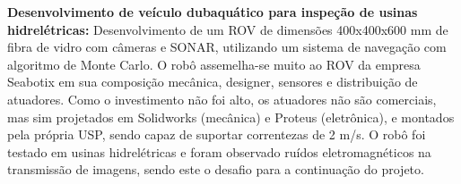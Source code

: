\textbf{Desenvolvimento de veículo dubaquático para inspeção de usinas
hidrelétricas:}
Desenvolvimento de um ROV de dimensões 400x400x600 mm de fibra de vidro com
câmeras e SONAR, utilizando um sistema de navegação com algoritmo de Monte
Carlo. O robô assemelha-se muito ao ROV da empresa Seabotix em sua composição
mecânica, designer, sensores e distribuição de atuadores. Como o investimento
não foi alto, os atuadores não são comerciais, mas sim projetados em Solidworks
(mecânica) e Proteus (eletrônica), e montados pela própria USP, sendo capaz de
suportar correntezas de 2 m/s. O robô foi testado em usinas
hidrelétricas e foram observado ruídos eletromagnéticos na transmissão de
imagens, sendo este o desafio para a continuação do projeto.
